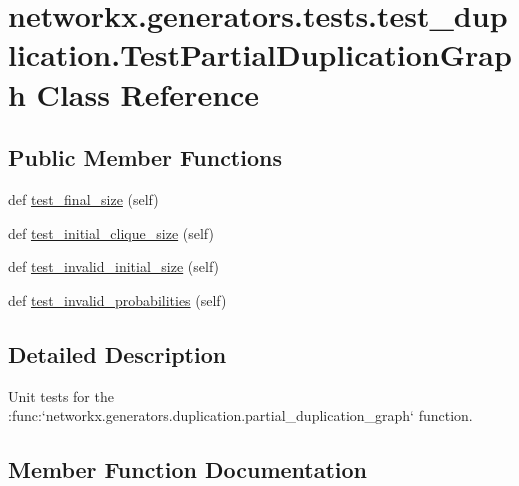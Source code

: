 \hypertarget{classnetworkx_1_1generators_1_1tests_1_1test__duplication_1_1TestPartialDuplicationGraph}{}\section{networkx.\+generators.\+tests.\+test\+\_\+duplication.\+Test\+Partial\+Duplication\+Graph Class Reference}
\label{classnetworkx_1_1generators_1_1tests_1_1test__duplication_1_1TestPartialDuplicationGraph}
\subsection*{Public Member Functions}
\begin{DoxyCompactItemize}
\item 
def \hyperlink{classnetworkx_1_1generators_1_1tests_1_1test__duplication_1_1TestPartialDuplicationGraph_a29fbd459dab8fb9750f9957e542aac54}{test\+\_\+final\+\_\+size} (self)
\item 
def \hyperlink{classnetworkx_1_1generators_1_1tests_1_1test__duplication_1_1TestPartialDuplicationGraph_a785f8c8681ef0825aee524a6f5b63dd5}{test\+\_\+initial\+\_\+clique\+\_\+size} (self)
\item 
def \hyperlink{classnetworkx_1_1generators_1_1tests_1_1test__duplication_1_1TestPartialDuplicationGraph_a8c138adfef80c92788e9207034e006c9}{test\+\_\+invalid\+\_\+initial\+\_\+size} (self)
\item 
def \hyperlink{classnetworkx_1_1generators_1_1tests_1_1test__duplication_1_1TestPartialDuplicationGraph_ae15bf23920be330b67ebe17a7c047055}{test\+\_\+invalid\+\_\+probabilities} (self)
\end{DoxyCompactItemize}


\subsection{Detailed Description}
\begin{DoxyVerb}Unit tests for the
:func:`networkx.generators.duplication.partial_duplication_graph`
function.\end{DoxyVerb}
 

\subsection{Member Function Documentation}
\mbox{\label{classnetworkx_1_1generators_1_1tests_1_1test__duplication_1_1TestPartialDuplicationGraph_a29fbd459dab8fb9750f9957e542aac54}} 

